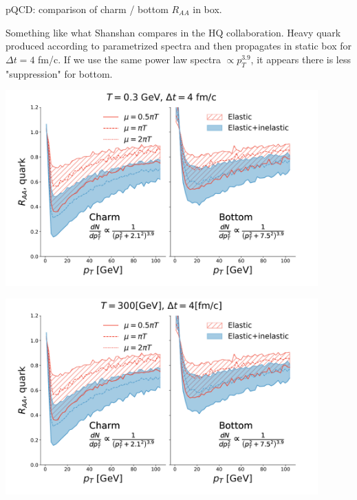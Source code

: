\documentclass[11pt]{beamer}
\begin{document}
\begin{frame}{pQCD: comparison of charm / bottom $R_{AA}$ in box.}

\begin{overprint}
Something like what Shanshan compares in the HQ collaboration. Heavy quark produced according to parametrized spectra and then propagates in static box for $\Delta t = 4$ fm/c. 
If we use the same power law spectra $\propto p_T^{3.9}$, it appears there is less "suppression" for bottom.
\end{overprint}

\begin{overprint}
\begin{center}
\includegraphics[width=0.9\textwidth]{fig/compare-plot/Box_Raa.pdf}
\end{center}
\begin{center}
\includegraphics[width=0.9\textwidth]{fig/compare-plot/same_Box_Raa.pdf}
\end{center}
\end{overprint}

\end{frame}
\end{document}
